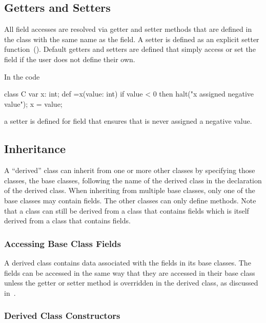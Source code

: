 \subsection{Getters and Setters}
\label{Getters_and_Setters}

All field accesses are resolved via getter and setter methods that are
defined in the class with the same name as the field.  A setter is
defined as an explicit setter
function~().  Default getters and
setters are defined that simply access or set the field if the user
does not define their own.

\begin{example}
In the code
\begin{chapel}
class C {
  var x: int;
  def =x(value: int) {
    if value < 0 then
      halt("x assigned negative value");
    x = value;
  }
}
\end{chapel}
a setter is defined for field  that ensures that  is
never assigned a negative value.
\end{example}

\subsection{Inheritance}
\label{Inheritance}

A ``derived'' class can inherit from one or more other classes by
specifying those classes, the base classes, following the name of the
derived class in the declaration of the derived class.  When
inheriting from multiple base classes, only one of the base classes
may contain fields.  The other classes can only define methods.  Note
that a class can still be derived from a class that contains fields
which is itself derived from a class that contains fields.

\subsubsection{Accessing Base Class Fields}
\label{Accessing_Base_Class_Fields}

A derived class contains data associated with the fields in its base
classes.  The fields can be accessed in the same way that they are
accessed in their base class unless the getter or setter method is
overridden in the derived class, as discussed
in~.

\subsubsection{Derived Class Constructors}
\label{Derived_Class_Constructors}

